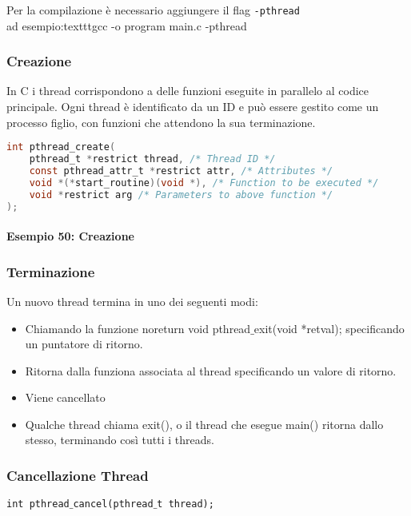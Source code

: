     Per la compilazione è necessario aggiungere il flag \texttt{-pthread} \\  ad esempio:texttt{gcc -o program main.c -pthread}
        \subsubsection{Creazione}
        In C i thread corrispondono a delle funzioni eseguite in parallelo al codice principale. Ogni thread è identificato da un ID e può essere gestito come un processo figlio, con funzioni che attendono la sua terminazione.
            \begin{lstlisting}[language=C]
int pthread_create(
    pthread_t *restrict thread, /* Thread ID */
    const pthread_attr_t *restrict attr, /* Attributes */
    void *(*start_routine)(void *), /* Function to be executed */
    void *restrict arg /* Parameters to above function */
);
            \end{lstlisting}
            \paragraph{Esempio 50: Creazione}\hfill \break
            
        \subsubsection{Terminazione}
Un nuovo thread termina in uno dei seguenti modi:

        \begin{itemize}
            \item Chiamando la funzione noreturn void pthread$\_$exit(void *retval); specificando un puntatore di ritorno.
            \item Ritorna dalla funziona associata al thread specificando un valore di ritorno.
            \item Viene cancellato
            \item Qualche thread chiama exit(), o il thread che esegue main() ritorna dallo stesso, terminando così tutti i threads.
        \end{itemize}

        \subsubsection{Cancellazione Thread}
        \texttt{int pthread$\_$cancel(pthread$\_$t thread);} \\
        
